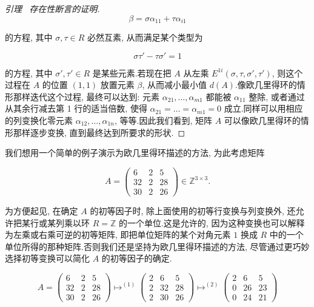 \begin{proof}[引理~ 存在性断言的证明]
\[
\beta = \sigma \alpha_{11} + \tau \alpha_{i1}\]

的方程, 其中 $\sigma, \tau \in R$ 必然互素, 从而满足某个类型为

\[
\sigma \tau' - \tau \sigma' = 1\]

的方程, 其中 $\sigma', \tau' \in R$ 是某些元素.若现在把 $A$ 从左乘 $E^{1i}(\sigma, \tau, \sigma', \tau')$, 则这个过程在 $A$ 的位置 $(1, 1)$ 放置元素 $\beta$, 从而减小最小值 $d(A)$.像欧几里得环的情形那样迭代这个过程, 最终可以达到: 元素 $\alpha_{21}, \ldots, \alpha_{m1}$ 都能被 $\alpha_{11}$ 整除, 或者通过从其余行减去第 1 行的适当倍数, 使得 $\alpha_{21} = \ldots = \alpha_{m1} = 0$ 成立.同样可以用相应的列变换化零元素 $\alpha_{12}, \ldots, \alpha_{1n}$, 等等.因此我们看到, 矩阵 $A$ 可以像欧几里得环的情形那样逐步变换, 直到最终达到所要求的形状.
\end{proof}

我们想用一个简单的例子演示为欧几里得环描述的方法, 为此考虑矩阵

\[
A = \left(\begin{array}{ccc} 6 & 2 & 5 \\ 32 & 2 & 28 \\ 30 & 2 & 26 \end{array}\right) \in \mathbb{Z}^{3 \times 3}\text{.}\]

为方便起见, 在确定 $A$ 的初等因子时, 除上面使用的初等行变换与列变换外, 还允许把某行或某列乘以环 $R = \mathbb{Z}$ 的一个单位.这是允许的, 因为这种变换也可以解释为左乘或右乘可逆的初等矩阵, 即把单位矩阵的某个对角元素 $1$ 换成 $R$ 中的一个单位所得的那种矩阵.否则我们还是坚持为欧几里得环描述的方法, 尽管通过更巧妙选择初等变换可以简化 $A$ 的初等因子的确定.

\[
A = \left(\begin{array}{ccc} 6 & 2 & 5 \\ 32 & 2 & 28 \\ 30 & 2 & 26 \end{array}\right)
\longmapsto^{(1)} \left(\begin{array}{ccc} 2 & 6 & 5 \\ 2 & 32 & 28 \\ 2 & 30 & 26 \end{array}\right)
\longmapsto^{(2)} \left(\begin{array}{ccc} 2 & 6 & 5 \\ 0 & 26 & 23 \\ 0 & 24 & 21 \end{array}\right)\]

